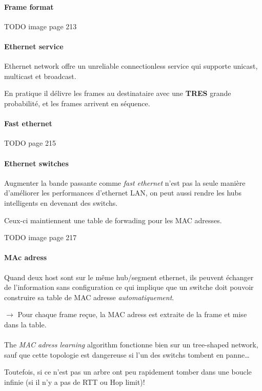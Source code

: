 \paragraph{Frame format}
TODO image page 213

\paragraph{Ethernet service}
Ethernet network offre un unreliable connectionless service qui supporte unicast, multicast et
broadcast.

En pratique il délivre les frames au destinataire avec une \textbf{TRES} grande probabilité,
et les frames arrivent en séquence.

\paragraph{Fast ethernet}
TODO page 215

\paragraph{Ethernet switches}
Augmenter la bande passante comme \textit{fast ethernet} n'est pas la seule
manière d'améliorer les performances d'ethernet LAN, on peut aussi rendre
les hubs intelligents en devenant des switchs.

Ceux-ci maintiennent une table de forwading pour les MAC adresses.

TODO image page 217


\paragraph{MAc adress}
Quand deux host sont sur le même hub/segment ethernet, ils peuvent échanger de
l'information sans configuration ce qui implique que un switche doit pouvoir
construire sa table de MAC adresse \textit{automatiquement}.

$\rightarrow$ Pour chaque frame reçue, la MAC adress est extraite de la frame et mise dans la table.

\paragraph{ }
The \textit{MAC adress learning} algorithm fonctionne bien sur un tree-shaped network,
sauf que cette topologie est dangereuse si l'un des switchs tombent en panne\ldots

Toutefois, si ce n'est pas un arbre ont peu rapidement tomber dans une boucle infinie
(si il n'y a pas de RTT ou Hop limit)!

